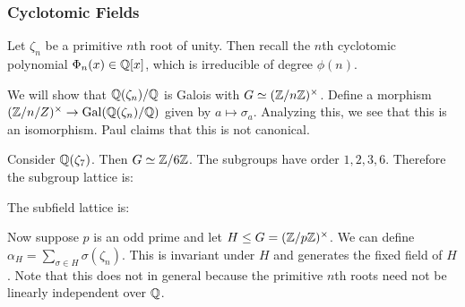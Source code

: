 \documentclass[10pt, twoside]{article}
\begin{document}
        \subsubsection{Cyclotomic Fields}
        
        Let $\zeta_n$ be a primitive $n$th root of unity. Then recall the $n$th
        cyclotomic polynomial $\Phi_n(x) \in \mathbb{Q}[x]$, which is irreducible of
        degree $\phi(n)$.

        We will show that $\mathbb{Q}(\zeta_n)/\mathbb{Q}$ is Galois with $G \simeq
        (\mathbb{Z}/n\mathbb{Z})^{\times}$. Define a morphism $(\mathbb{Z}/n/Z)^{\times} \to
        \mathrm{Gal}(\mathbb{Q}(\zeta_n)/\mathbb{Q})$ given by $a \mapsto \sigma_a$. Analyzing
        this, we see that this is an isomorphism. Paul claims that this is not
        canonical.

        \begin{exm} Consider $\mathbb{Q}(\zeta_7)$. Then $G \simeq \mathbb{Z}/6\mathbb{Z}$. The
            subgroups have order $1,2,3,6$.  Therefore the subgroup lattice is:
            \begin{center}  \end{center}
            
            The subfield lattice is: \begin{center}  \end{center} \end{exm}
        
        Now suppose $p$ is an odd prime and let $H \leq G = (\mathbb{Z}/p\mathbb{Z})^{\times}$.
        We can define $\alpha_H = \sum_{\sigma \in H} \sigma(\zeta_n)$. This is
        invariant under $H$ and generates the fixed field of $H$. Note that
        this does not in general because the primitive $n$th roots need not be
        linearly independent over $\mathbb{Q}$.
\end{document}
